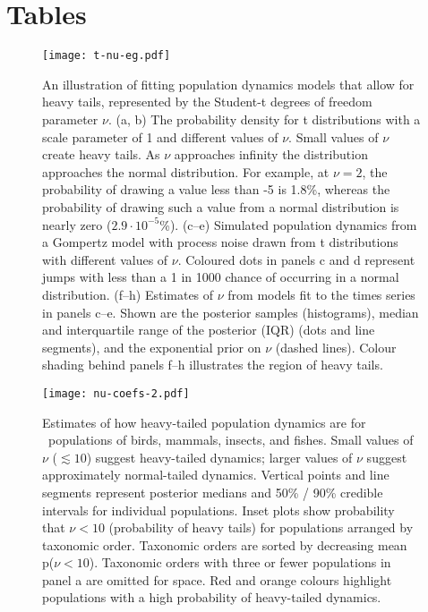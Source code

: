 \section{Tables}



\begin{figure}[htbp]
\begin{center}
\texttt{[image: t-nu-eg.pdf]}
\caption{
An illustration of fitting population dynamics models that allow for heavy tails, represented by the Student-t degrees of freedom parameter $\nu$.
(a, b) The probability density for t distributions with a scale parameter of 1 and different values of $\nu$.
Small values of $\nu$ create heavy tails.
As $\nu$ approaches infinity the distribution approaches the normal distribution.
For example, at $\nu = 2$, the probability of drawing a value less than -5 is 1.8\%, whereas the probability of drawing such a value from a normal distribution is nearly zero ($2.9\cdot10^{-5}$\%).
(c--e) Simulated population dynamics from a Gompertz model with process noise drawn from t distributions with different values of $\nu$.
Coloured dots in panels c and d represent jumps with less than a 1 in 1000 chance of occurring in a normal distribution.
(f--h) Estimates of $\nu$ from models fit to the times series in panels c--e.
Shown are the posterior samples (histograms), median and interquartile range of the posterior (IQR) (dots and line segments), and the exponential prior on $\nu$ (dashed lines).
Colour shading behind panels f--h illustrates the region of heavy tails.}
\label{fig:didactic}
\end{center}
\end{figure}

\clearpage

\begin{figure}[htbp]
\begin{center}
\texttt{[image: nu-coefs-2.pdf]}
\caption{
Estimates of how heavy-tailed population dynamics are for \nuCoefPopN\ populations of birds, mammals, insects, and fishes.
Small values of $\nu$ ($\lesssim 10$) suggest heavy-tailed dynamics; larger values of $\nu$ suggest approximately normal-tailed dynamics.
Vertical points and line segments represent posterior medians and 50\% / 90\% credible intervals for individual populations.
Inset plots show probability that $\nu < 10$ (probability of heavy tails) for populations arranged by taxonomic order.
Taxonomic orders are sorted by decreasing mean p($\nu < 10$).
Taxonomic orders with three or fewer populations in panel a are omitted for space.
Red and orange colours highlight populations with a high probability of heavy-tailed dynamics.
}
\label{fig:nu-coefs}
\end{center}
\end{figure}

